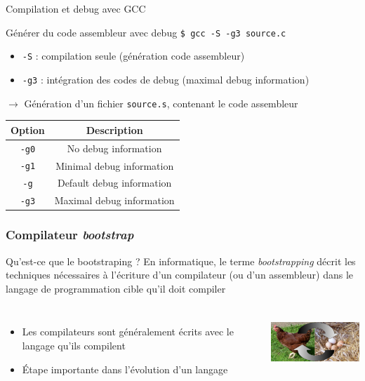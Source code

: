\begin{frame}{Compilation et debug avec GCC}
\begin{exampleblock}{Générer du code assembleur avec debug}
\texttt{\$ gcc -S -g3 source.c}
\begin{itemize}
\item \texttt{-S} : compilation seule (génération code assembleur)
\item \texttt{-g3} : intégration des codes de debug (maximal debug information)
\end{itemize}
$\rightarrow$ Génération d'un fichier \texttt{source.s}, contenant le code assembleur
\end{exampleblock}

\begin{table}[htdp]
\begin{center}
\begin{tabular}{|c|c|}
\hline
Option&Description\\
\hline
\texttt{-g0} & No debug information \\
\texttt{-g1} & Minimal debug information \\
\texttt{-g} & Default debug information \\
\texttt{-g3} & Maximal debug information \\
\hline
\end{tabular}
\end{center}
\end{table}

\end{frame}



\begin{frame}
\frametitle{Compilateur \textit{bootstrap}}
\begin{block}{Qu'est-ce que le bootstraping ?}
En informatique, le terme \emph{bootstrapping} décrit les techniques nécessaires à l'écriture d'un compilateur (ou d'un assembleur) dans le langage de programmation cible qu'il doit compiler
\end{block}

\begin{columns}
\begin{itemize}
\item Les compilateurs sont généralement écrits avec le langage qu'ils compilent
\item Étape importante dans l'évolution d'un langage
\end{itemize}
\includegraphics[height=2cm]{../illustration/Chickenegg.jpg}
\end{columns}
\end{frame}




